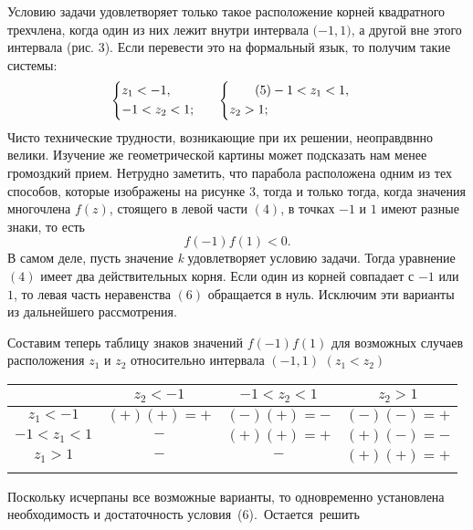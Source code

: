 \begin{multicols}{2}
Условию задачи удовлетворяет только такое расположение
корней квадратного трехчлена, когда один из них лежит внутри
интервала $(-1,$\linebreak$1)$, а другой вне этого
интервала (рис. 3). Если перевести это на формальный язык, то получим
такие системы:
\begin{alignat*}{2}
  \begin{cases*}
    z_1 < -1, \\
    -1 < z_2 < 1;
  \end{cases*} && \hspace{0.25cm} & 
  \begin{cases*}\tag{5}
    -1 < z_1 < 1,\\
    z_2 > 1;
  \end{cases*}
\end{alignat*}
\noindent
Чисто технические трудности, возникающие при их решении,
неоправдвнно велики. Изучение же геометрической картины
может подсказать нам менее громоздкий прием.
Нетрудно заметить, что парабола расположена одним
из тех способов, которые изображены на рисунке 3, тогда
и только тогда, когда значения многочлена $f(z)$,
стоящего в левой части $(4)$, в точках $-1$ и $1$ имеют
разные знаки, то есть
\begin{equation}\tag{6}
  f(-1) f(1) < 0.
\end{equation}
\noindent
В самом деле, пусть значение \textit{k} удовлетворяет условию задачи.
Тогда уравнение $(4)$ имеет два действительных корня.
Если один из корней совпадает с $-1$ или $1$, то левая часть
неравенства $(6)$ обращается в нуль. Исключим эти варианты из дальнейшего рассмотрения.


Составим теперь таблицу знаков значений $f(-1) f(1)$ для возможных случаев расположения
$z_1$ и $z_2$ относительно интервала $(-1, 1)$
\newline
$(z_1 < z_2)$

\tiny
{\centering
\begin{tabular}{ c | c | c | c }
  & $z_2 < -1$ & $-1 < z_2 < 1$ & $z_2 > 1$ \\
  \hline
  $z_1 < -1$ & $(+)(+)=+$ & $(-)(+)=-$ & $(-)(-)=+$ \\
  $-1 < z_1 < 1$ & $-$ & $(+)(+)=+$ & $(+)(-)=-$ \\
  $z_1 > 1$ & $-$ & $-$ & $(+)(+)=+$ \\
  & & & \\
\end{tabular}
}
\normalsize


Поскольку исчерпаны все возможные варианты,
то одновременно установлена необходимость и достаточность \mbox{условия (6).
Остается решить}
\end{multicols}
